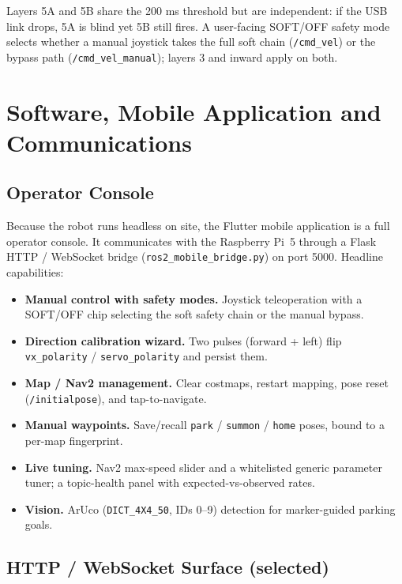 \documentclass[12pt,a4paper]{report}
\begin{document}
Layers 5A and 5B share the 200 ms threshold but are independent: if the USB link
drops, 5A is blind yet 5B still fires. A user-facing SOFT/OFF safety mode selects
whether a manual joystick takes the full soft chain (\texttt{/cmd\_vel}) or the
bypass path (\texttt{/cmd\_vel\_manual}); layers 3 and inward apply on both.

\chapter{Software, Mobile Application and Communications}
\label{ch:appcomms}

\section{Operator Console}

Because the robot runs headless on site, the Flutter mobile application is a full
operator console. It communicates with the Raspberry Pi~5 through a Flask HTTP /
WebSocket bridge (\texttt{ros2\_mobile\_bridge.py}) on port 5000. Headline
capabilities:

\begin{itemize}[leftmargin=1.4cm]
    \item \textbf{Manual control with safety modes.} Joystick teleoperation with a
          SOFT/OFF chip selecting the soft safety chain or the manual bypass.
    \item \textbf{Direction calibration wizard.} Two pulses (forward + left) flip
          \texttt{vx\_polarity} / \texttt{servo\_polarity} and persist them.
    \item \textbf{Map / Nav2 management.} Clear costmaps, restart mapping, pose
          reset (\texttt{/initialpose}), and tap-to-navigate.
    \item \textbf{Manual waypoints.} Save/recall \texttt{park} / \texttt{summon} /
          \texttt{home} poses, bound to a per-map fingerprint.
    \item \textbf{Live tuning.} Nav2 max-speed slider and a whitelisted generic
          parameter tuner; a topic-health panel with expected-vs-observed rates.
    \item \textbf{Vision.} ArUco (\texttt{DICT\_4X4\_50}, IDs 0--9) detection for
          marker-guided parking goals.
\end{itemize}

\section{HTTP / WebSocket Surface (selected)}
\end{document}

